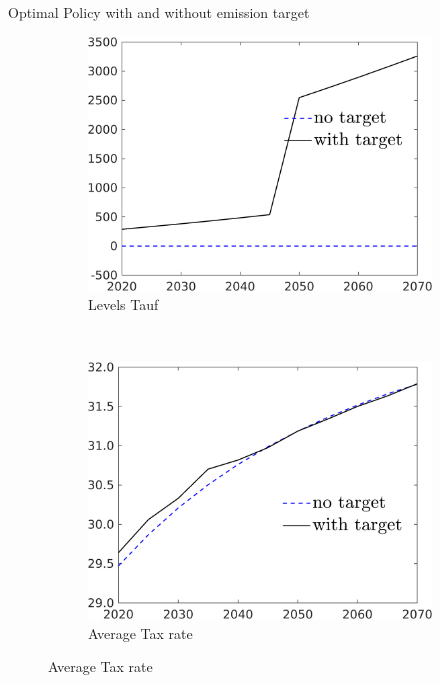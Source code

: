 \documentclass[11pt,aspectratio=169]{beamer}
\begin{document}
\begin{frame}{Optimal Policy with and without emission target}
	\begin{figure}[h!!]
		\centering
		\begin{subfigure}{0.4\textwidth}		
			\caption{{Levels  Tauf}}
			\includegraphics[width=1\textwidth]{../codding_model/own_basedOnFried/optimalPol_010922_revision/figures/all_13Sept22/NewCalib_pol_TvsNoT_Tauf_emnet1_Sun2_spillover0_knspil3_xgr0_nsk0_sep0_extern0_PV1_etaa0.79_lgd1.png}
		\end{subfigure}
		\begin{minipage}[]{0.1\textwidth}
			\
		\end{minipage}
		\begin{subfigure}{0.4\textwidth}		
			\caption{{Average Tax rate}}
			\includegraphics[width=1\textwidth]{../codding_model/own_basedOnFried/optimalPol_010922_revision/figures/all_13Sept22/NewCalib_pol_TvsNoT_dTaulAvS_emnet1_Sun2_spillover0_knspil3_xgr0_nsk0_sep0_extern0_PV1_etaa0.79_lgd1.png}
		\end{subfigure}
	\end{figure}
\end{frame}
\end{document}
